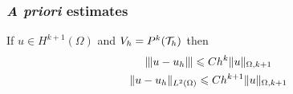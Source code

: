 \begin{frame}[t]
  \frametitle{\emph{A priori} estimates}
    If $u \in H^{k+1}(\Omega)$ and $V_h = P^k(\mathcal{T}_h)$ then
    \begin{gather*}
      |\mspace{-1mu}|\mspace{-1mu}| u - u_h |\mspace{-1mu}|\mspace{-1mu}| \leqslant C h^{k} \| u \|_{\Omega, k+1} \\
      \| u - u_h \|_{L^2(\Omega)} \leqslant C h^{k+1} \| u \|_{\Omega, k+1}
    \end{gather*}
  \begin{columns}[c]
    \begin{column}{0.4\textwidth}
    \end{column}
    \begin{column}{0.6\textwidth}
    \end{column}
  \end{columns}
\end{frame}
